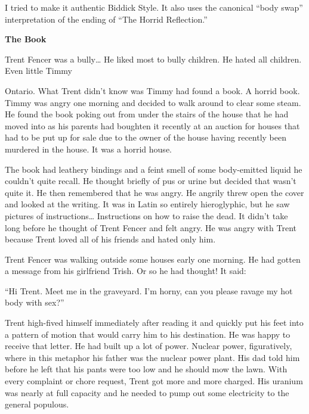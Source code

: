I tried to make it authentic Biddick Style. It also uses the
canonical ``body swap'' interpretation of the ending of ``The Horrid
Reflection.''



{\bf The Book}



Trent Fencer was a bully{\ldots} He liked most to bully children. He
hated all children. Even little Timmy

Ontario. What Trent didn't know was Timmy had found a book. A
horrid book. Timmy was angry one morning and decided to walk around
to clear some steam. He found the book poking out from under the
stairs of the house that he had moved into as his parents had
boughten it recently at an auction for houses that had to be put up
for sale due to the owner of the house having recently been
murdered in the house. It was a horrid house.



The book had leathery bindings and a feint smell of some
body-emitted liquid he couldn't quite recall. He thought briefly of
pus or urine but decided that wasn't quite it. He then remembered
that he was angry. He angrily threw open the cover and looked at
the writing. It was in Latin so entirely hieroglyphic, but he saw
pictures of instructions{\ldots} Instructions on how to raise the dead.
It didn't take long before he thought of Trent Fencer and felt
angry. He was angry with Trent because Trent loved all of his
friends and hated only him.



Trent Fencer was walking outside some houses early one morning. He
had gotten a message from his girlfriend Trish. Or so he had
thought! It said:



``Hi Trent. Meet me in the graveyard. I'm horny, can you please
ravage my hot body with sex?''



Trent high-fived himself immediately after reading it and quickly
put his feet into a pattern of motion that would carry him to his
destination. He was happy to receive that letter. He had built up a
lot of power. Nuclear power, figuratively, where in this metaphor
his father was the nuclear power plant. His dad told him before he
left that his pants were too low and he should mow the lawn. With
every complaint or chore request, Trent got more and more charged.
His uranium was nearly at full capacity and he needed to pump out
some electricity to the general populous.



